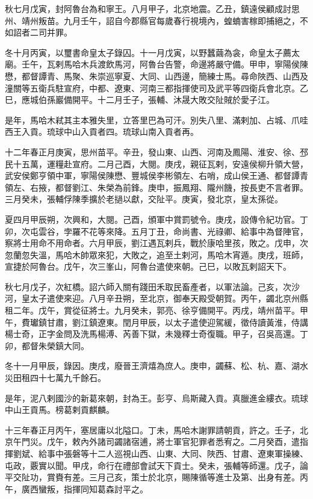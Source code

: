 \begin{pinyinscope}
秋七月戊寅，封阿魯台為和寧王。八月甲子，北京地震。乙丑，鎮遠侯顧成討思州、靖州叛苗。九月壬午，詔自今郡縣官每歲春行視境內，蝗蝻害稼即捕絕之，不如詔者二司并罪。

冬十月丙寅，以璽書命皇太子錄囚。十一月戊寅，以野蠶繭為衾，命皇太子薦太廟。壬午，瓦剌馬哈木兵渡飲馬河，阿魯台告警，命邊將嚴守備。甲申，寧陽侯陳懋，都督譚青、馬聚、朱崇巡寧夏、大同、山西邊，簡練士馬。尋命陜西、山西及潼關等五衛兵駐宣府，中都、遼東、河南三都指揮使司及武平等四衛兵會北京。乙巳，應城伯孫巖備開平。十二月壬子，張輔、沐晟大敗交阯賊於愛子江。

是年，馬哈木弒其主本雅失里，立答里巴為可汗。別失八里、滿剌加、占城、爪哇西王入貢。琉球中山入貢者四。琉球山南入貢者再。

十二年春正月庚寅，思州苗平。辛丑，發山東、山西、河南及鳳陽、淮安、徐、邳民十五萬，運糧赴宣府。二月己酉，大閱。庚戌，親征瓦剌，安遠侯柳升領大營，武安侯鄭亨領中軍，寧陽侯陳懋、豐城侯李彬領左、右哨，成山侯王通、都督譚青領左、右掖，都督劉江、朱榮為前鋒。庚申，振鳳翔、隴州饑，按長吏不言者罪。三月癸未，張輔俘陳季擴於老撾以獻，交阯平。庚寅，發北京，皇太孫從。

夏四月甲辰朔，次興和，大閱。己酉，頒軍中賞罰號令。庚戌，設傳令紀功官。丁卯，次屯雲谷，孛羅不花等來降。五月丁丑，命尚書、光祿卿、給事中為督陣官，察將士用命不用命者。六月甲辰，劉江遇瓦剌兵，戰於康哈里孩，敗之。戊申，次忽蘭忽失溫，馬哈木帥眾來犯，大敗之，追至土剌河，馬哈木宵遁。庚戌，班師，宣捷於阿魯台。戊午，次三峯山，阿魯台遣使來朝。己巳，以敗瓦剌詔天下。

秋七月戊子，次紅橋。詔六師入關有踐田禾取民畜產者，以軍法論。己亥，次沙河，皇太子遣使來迎。八月辛丑朔，至北京，御奉天殿受朝賀。丙午，蠲北京州縣租二年。戊午，賞從征將士。九月癸未，郭亮、徐亨備開平。丙戌，靖州苗平。甲午，費瓛鎮甘肅，劉江鎮遼東。閏月甲辰，以太子遣使迎駕緩，徵侍讀黃淮，侍講楊士奇，正字金問及洗馬楊溥、芮善下獄，未幾釋士奇復職。甲子，召吳高還。丁卯，都督朱榮鎮大同。

冬十一月甲辰，錄因。庚戌，廢晉王濟熺為庶人。庚申，蠲蘇、松、杭、嘉、湖水災田租四十七萬九千餘石。

是年，泥八剌國沙的新葛來朝，封為王。彭亨、烏斯藏入貢。真臘進金縷衣。琉球中山王貢馬。榜葛剌貢麒麟。

十三年春正月丙午，塞居庸以北隘口。丁未，馬哈木謝罪請朝貢，許之。壬子，北京午門災。戊午，敕內外諸司蠲諸宿逋，將士軍官犯罪者悉宥之。二月癸酉，遣指揮劉斌、給事中張磐等十二人巡視山西、山東、大同、陜西、甘肅、遼東軍操練、屯政，覈實以聞。甲戌，命行在禮部會試天下貢士。癸未，張輔等師還。戊子，論平交阯功，賞賚有差。三月己亥，策士於北京，賜陳循等進士及第、出身有差。丙午，廣西蠻叛，指揮同知葛森討平之。


\end{pinyinscope}
